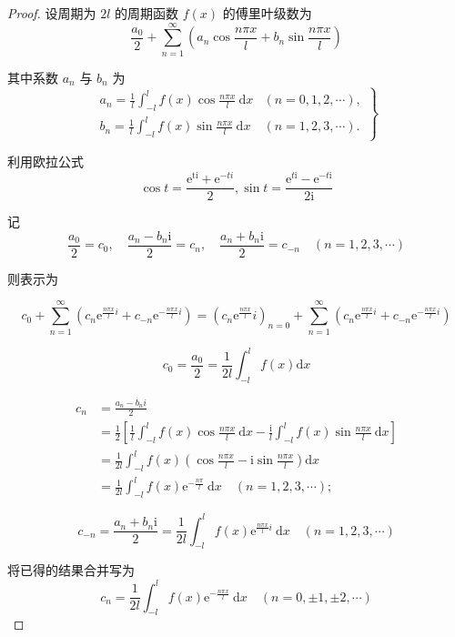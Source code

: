 \begin{proof}
    设周期为 $ 2 l $ 的周期函数 $ f(x) $ 的傅里叶级数为
$$
\frac{a_{0}}{2}+\sum_{n=1}^{\infty}\left(a_{n} \cos \frac{n \pi x}{l}+b_{n} \sin \frac{n \pi x}{l}\right)
$$

其中系数 $ a_{n} $ 与 $ b_{n} $ 为
$$
\left.\begin{array}{ll}
a_{n}=\frac{1}{l} \int_{-l}^{l} f(x) \cos \frac{n \pi x}{l} \mathrm{~d} x & (n=0,1,2, \cdots), \\
b_{n}=\frac{1}{l} \int_{-l}^{l} f(x) \sin \frac{n \pi x}{l} \mathrm{~d} x & (n=1,2,3, \cdots) .
\end{array}\right\}
$$

利用欧拉公式
$$ \cos t=\frac{\mathrm{e}^{\mathrm{ti}}+\mathrm{e}^{-t i}}{2}, \sin t=\frac{\mathrm{e}^{t \mathrm{i}}-\mathrm{e}^{-t \mathrm{i}}}{2 \mathrm{i}} $$

记
$$
\frac{a_{0}}{2}=c_{0}, \quad \frac{a_{n}-b_{n} \mathrm{i}}{2}=c_{n}, \quad \frac{a_{n}+b_{n} \mathrm{i}}{2}=c_{-n} \quad(n=1,2,3, \cdots)
$$

则表示为

$$ c_{0}+\sum_{n=1}^{\infty}\left(c_{n} \mathrm{e}^{\frac{n \pi x}{l} i}+c_{-n} \mathrm{e}^{-\frac{n \pi x}{l} i}\right) =\left(c_{n} \mathrm{e}^{\frac{n \pi x}{l}}i\right)_{n=0}+\sum_{n=1}^{\infty}\left(c_{n} \mathrm{e}^{\frac{n \pi x}{l}i}+c_{-n} \mathrm{e}^{-\frac{n \pi x}{l}i}\right) $$

$$ c_{0}=\frac{a_{0}}{2}=\frac{1}{2 l} \int_{-l}^{l} f(x) \mathrm{d} x $$

$$
\begin{aligned}
   c_{n} &=\frac{a_{n}-b_{n} i}{2}  \\
   &=\frac{1}{2}\left[\frac{1}{l} \int_{-l}^{l} f(x) \cos \frac{n \pi x}{l} \mathrm{~d} x-\frac{\mathrm{i}}{l} \int_{-l}^{l} f(x) \sin \frac{n \pi x}{l} \mathrm{~d} x\right] \\
   &=\frac{1}{2 l} \int_{-l}^{l} f(x)\left(\cos \frac{n \pi x}{l}-\mathrm{i} \sin \frac{n \pi x}{l}\right) \mathrm{d} x\\
   &=\frac{1}{2 l} \int_{-l}^{l} f(x) \mathrm{e}^{-\frac{n \pi}{l}} \mathrm{~d} x \quad(n=1,2,3, \cdots) ;
\end{aligned}
$$

$$ c_{-n}=\frac{a_{n}+b_{n} \mathrm{i}}{2}=\frac{1}{2 l} \int_{-l}^{l} f(x) \mathrm{e}^{\frac{n \pi x}{l} i} \mathrm{~d} x \quad(n=1,2,3, \cdots) $$

将已得的结果合并写为
$$
c_{n}=\frac{1}{2 l} \int_{-l}^{l} f(x) \mathrm{e}^{-\frac{n \pi x}{l}} \mathrm{~d} x \quad(n=0, \pm 1, \pm 2, \cdots)
$$

\end{proof}

